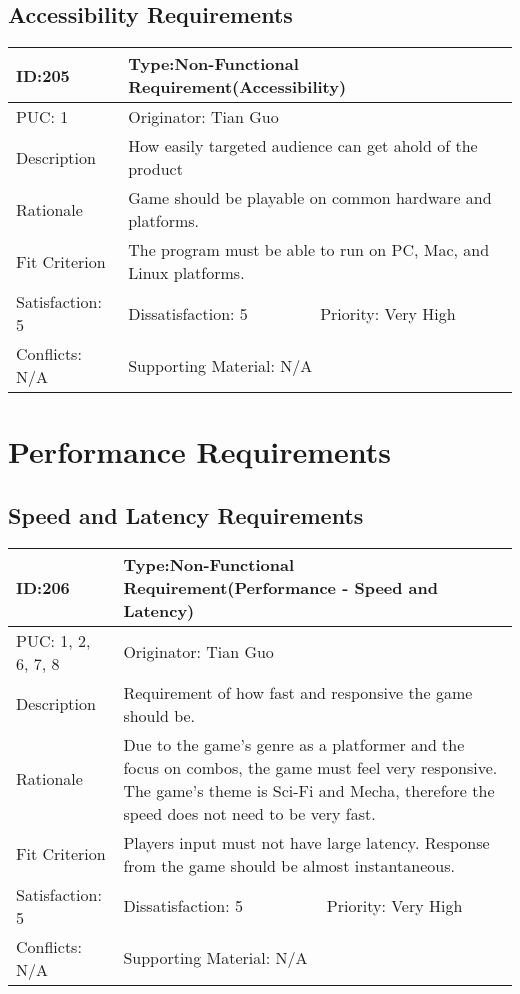 \documentclass{article}
\begin{document}
	\subsection{Accessibility Requirements}
	\begin{table}[H]
		\begin{tabular}{|l|l|l|}
			\hline
			ID:205 & \multicolumn{2}{l|}{Type:Non-Functional Requirement(Accessibility)} \\ \hline
			PUC: 1 & \multicolumn{2}{l|}{Originator: Tian Guo} \\ \hline
			Description & \multicolumn{2}{m{0.85\textwidth}|}{How easily targeted audience can get ahold of the product} \\ \hline
			Rationale & \multicolumn{2}{m{0.85\textwidth}|}{Game should be playable on common hardware and platforms.} \\ \hline
			Fit Criterion & \multicolumn{2}{m{0.85\textwidth}|}{The program must be able to run on PC, Mac, and Linux platforms.} \\ \hline
			Satisfaction: 5 & Dissatisfaction: 5 & Priority: Very High \\ \hline
			Conflicts: N/A & \multicolumn{2}{l|}{Supporting Material: N/A} \\ \hline
		\end{tabular}
	\end{table}

	\section{Performance Requirements}
	\subsection{Speed and Latency Requirements}
	\begin{table}[H]
		\begin{tabular}{|l|l|l|}
			\hline
			ID:206 & \multicolumn{2}{l|}{Type:Non-Functional Requirement(Performance - Speed and Latency)} \\ \hline
			PUC: 1, 2, 6, 7, 8  & \multicolumn{2}{l|}{Originator: Tian Guo} \\ \hline
			Description & \multicolumn{2}{m{0.85\textwidth}|}{Requirement of how fast and responsive the game should be.} \\ \hline
			Rationale & \multicolumn{2}{m{0.85\textwidth}|}{Due to the game’s genre as a platformer and the focus on combos, the game must feel very responsive. The game’s theme is Sci-Fi and Mecha, therefore the speed does not need to be very fast.} \\ \hline
			Fit Criterion & \multicolumn{2}{m{0.85\textwidth}|}{Players input must not have large latency. Response from the game should be almost instantaneous.} \\ \hline
			Satisfaction: 5 & Dissatisfaction: 5 & Priority: Very High \\ \hline
			Conflicts: N/A & \multicolumn{2}{l|}{Supporting Material: N/A} \\ \hline
		\end{tabular}
	\end{table}
\end{document}
